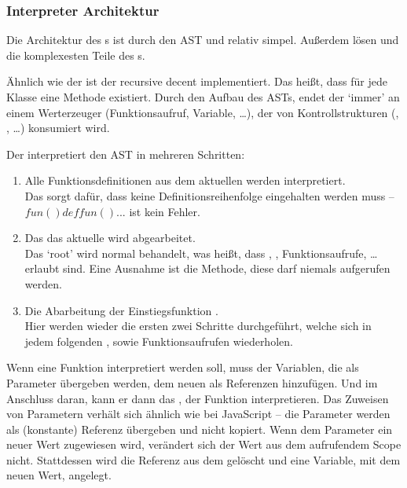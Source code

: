     \subsubsection{Interpreter Architektur}
    \label{sssec:Interpreter Architektur}
      Die Architektur des s ist durch den AST und  relativ simpel. Außerdem lösen  und  die komplexesten Teile des s.

      Ähnlich wie der  ist der  recursive decent implementiert. Das heißt, dass für jede  Klasse eine  Methode existiert. Durch den Aufbau des ASTs, endet der  `immer' an einem Werterzeuger (Funktionsaufruf, Variable, \ldots), der von Kontrollstrukturen (, , \ldots) konsumiert wird.

      Der  interpretiert den AST in mehreren Schritten:
      \begin{enumerate}
        \item Alle Funktionsdefinitionen aus dem aktuellen  werden interpretiert.\\
          Das sorgt dafür, dass keine Definitionsreihenfolge eingehalten werden muss -- \myMIn$fun() def fun() {...}$ ist kein Fehler.
        \item Das das aktuelle  wird abgearbeitet.\\
          Das `root'  wird normal behandelt, was heißt, dass , , Funktionsaufrufe, \ldots{} erlaubt sind. Eine Ausnahme ist die  Methode, diese darf niemals aufgerufen werden.
        \item Die Abarbeitung der Einstiegsfunktion .\\
          Hier werden wieder die ersten zwei Schritte durchgeführt, welche sich in jedem folgenden , sowie Funktionsaufrufen wiederholen.
      \end{enumerate}

      Wenn eine Funktion interpretiert werden soll, muss der  Variablen, die als Parameter übergeben werden, dem neuen  als Referenzen hinzufügen. Und im Anschluss daran, kann er dann das , der Funktion interpretieren. Das Zuweisen von Parametern verhält sich ähnlich wie bei JavaScript -- die Parameter werden als (konstante) Referenz übergeben und nicht kopiert. Wenn dem Parameter ein neuer Wert zugewiesen wird, verändert sich der Wert aus dem aufrufendem Scope nicht. Stattdessen wird die Referenz aus dem  gelöscht und eine Variable, mit dem neuen Wert, angelegt.

